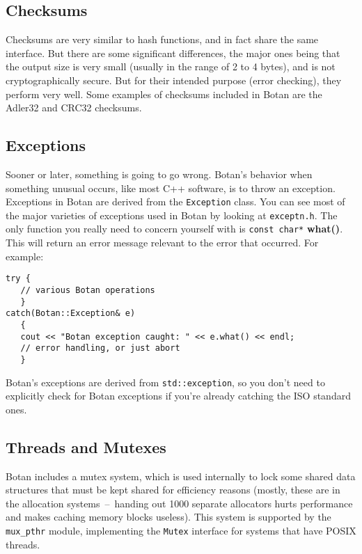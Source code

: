 \documentclass{article}
\newcommand{\filename}[1]{\texttt{#1}}
\newcommand{\function}[1]{\textbf{#1}}
\newcommand{\type}[1]{\texttt{#1}}
\begin{document}
\subsection{Checksums}

Checksums are very similar to hash functions, and in fact share the same
interface. But there are some significant differences, the major ones being
that the output size is very small (usually in the range of 2 to 4 bytes), and
is not cryptographically secure. But for their intended purpose (error
checking), they perform very well. Some examples of checksums included in Botan
are the Adler32 and CRC32 checksums.

\subsection{Exceptions}

Sooner or later, something is going to go wrong. Botan's behavior when
something unusual occurs, like most C++ software, is to throw an exception.
Exceptions in Botan are derived from the \type{Exception} class. You can see
most of the major varieties of exceptions used in Botan by looking at
\filename{exceptn.h}. The only function you really need to concern yourself
with is \type{const char*} \function{what()}. This will return an error message
relevant to the error that occurred. For example:

\begin{verbatim}
try {
   // various Botan operations
   }
catch(Botan::Exception& e)
   {
   cout << "Botan exception caught: " << e.what() << endl;
   // error handling, or just abort
   }
\end{verbatim}

Botan's exceptions are derived from \type{std::exception}, so you don't need
to explicitly check for Botan exceptions if you're already catching the ISO
standard ones.

\subsection{Threads and Mutexes}

Botan includes a mutex system, which is used internally to lock some shared
data structures that must be kept shared for efficiency reasons (mostly, these
are in the allocation systems~--~handing out 1000 separate allocators hurts
performance and makes caching memory blocks useless). This system is supported
by the \texttt{mux\_pthr} module, implementing the \type{Mutex} interface for
systems that have POSIX threads.
\end{document}

